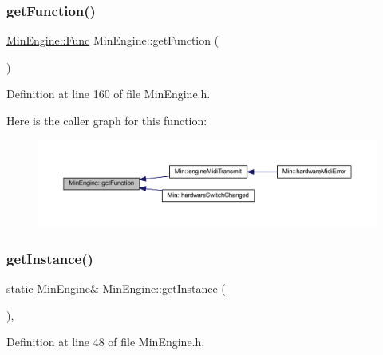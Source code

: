 \subsubsection{\texorpdfstring{get\+Function()}{getFunction()}}
{\footnotesize\ttfamily \hyperlink{class_min_engine_a30e1f14df71447889a8a5060cff6fbd8}{Min\+Engine\+::\+Func} Min\+Engine\+::get\+Function (\begin{DoxyParamCaption}{ }\end{DoxyParamCaption})\hspace{0.3cm}{\ttfamily [inline]}}



Definition at line 160 of file Min\+Engine.\+h.

Here is the caller graph for this function\+:
\nopagebreak
\begin{figure}[H]
\begin{center}
\leavevmode
\includegraphics[width=350pt]{class_min_engine_a36831a348bb8157f2cc3a4720d92434e_icgraph}
\end{center}
\end{figure}
\mbox{\label{class_min_engine_a1af3fc41e2660fff51bbab55a09951ec}} 
\subsubsection{\texorpdfstring{get\+Instance()}{getInstance()}}
{\footnotesize\ttfamily static \hyperlink{class_min_engine}{Min\+Engine}\& Min\+Engine\+::get\+Instance (\begin{DoxyParamCaption}{ }\end{DoxyParamCaption})\hspace{0.3cm}{\ttfamily [inline]}, {\ttfamily [static]}}



Definition at line 48 of file Min\+Engine.\+h.

\mbox{\label{class_min_engine_a4d41a91ebf44df8b8d6912293a3a3452}} 
